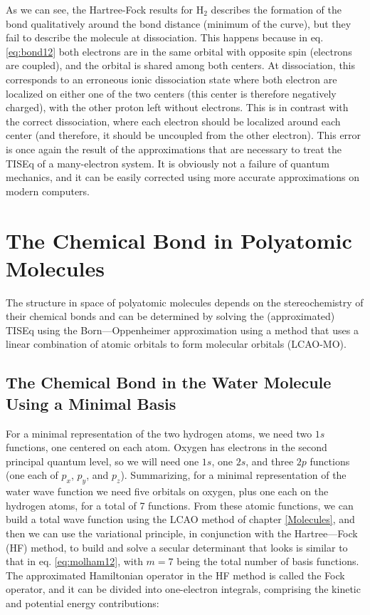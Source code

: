 \documentclass[
  9pt,
]{extbook}
\theoremstyle{definition}
\theoremstyle{definition}
\theoremstyle{definition}
\theoremstyle{remark}
\begin{document}
As we can see, the Hartree-Fock results for \(\mathrm{H}_2\) describes the formation of the bond qualitatively around the bond distance (minimum of the curve), but they fail to describe the molecule at dissociation. This happens because in eq. \eqref{eq:bond12} both electrons are in the same orbital with opposite spin (electrons are coupled), and the orbital is shared among both centers. At dissociation, this corresponds to an erroneous ionic dissociation state where both electron are localized on either one of the two centers (this center is therefore negatively charged), with the other proton left without electrons. This is in contrast with the correct dissociation, where each electron should be localized around each center (and therefore, it should be uncoupled from the other electron). This error is once again the result of the approximations that are necessary to treat the TISEq of a many-electron system. It is obviously not a failure of quantum mechanics, and it can be easily corrected using more accurate approximations on modern computers.

\hypertarget{Poly}{%
\chapter{The Chemical Bond in Polyatomic Molecules}\label{Poly}}

The structure in space of polyatomic molecules depends on the stereochemistry of their chemical bonds and can be determined by solving the (approximated) TISEq using the Born---Oppenheimer approximation using a method that uses a linear combination of atomic orbitals to form molecular orbitals (LCAO-MO).

\hypertarget{the-chemical-bond-in-the-water-molecule-using-a-minimal-basis}{%
\section{The Chemical Bond in the Water Molecule Using a Minimal Basis}\label{the-chemical-bond-in-the-water-molecule-using-a-minimal-basis}}

For a minimal representation of the two hydrogen atoms, we need two \(1s\) functions, one centered on each atom. Oxygen has electrons in the second principal quantum level, so we will need one \(1s\), one \(2s\), and three \(2p\) functions (one each of \(p_x\), \(p_y\), and \(p_z\)). Summarizing, for a minimal representation of the water wave function we need five orbitals on oxygen, plus one each on the hydrogen atoms, for a total of 7 functions. From these atomic functions, we can build a total wave function using the LCAO method of chapter \ref{Molecules}, and then we can use the variational principle, in conjunction with the Hartree---Fock (HF) method, to build and solve a secular determinant that looks is similar to that in eq. \eqref{eq:molham12}, with \(m=7\) being the total number of basis functions. The approximated Hamiltonian operator in the HF method is called the Fock operator, and it can be divided into one-electron integrals, comprising the kinetic and potential energy contributions:
\end{document}
